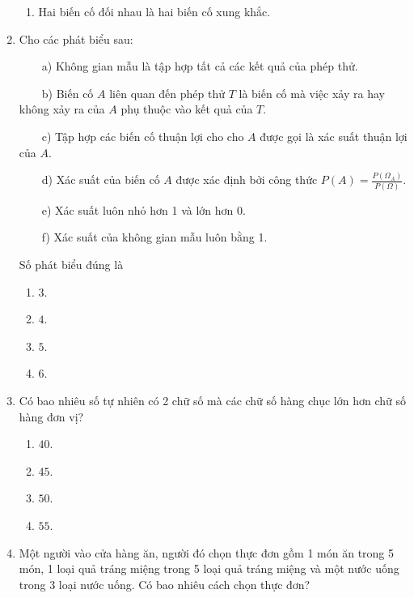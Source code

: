 \begin{enumerate}[label=\textbf{Câu \arabic*.},align=left,left=0cm..0cm,itemindent=*]
\begin{enumerate}[label=\textbf{\Alph*.},align=left,left=1cm..0cm,itemindent=*]
		\item Hai biến cố đối nhau là hai biến cố xung khắc.
	\end{enumerate}
	\item Cho các phát biểu sau:\par
	~~~~a) Không gian mẫu là tập hợp tất cả các kết quả của phép thử.\par
	~~~~b) Biến cố $A$ liên quan đến phép thử $T$ là biến cố mà việc xảy ra hay không xảy ra của $A$ phụ thuộc vào kết quả của $T$.\par
	~~~~c) Tập hợp các biến cố thuận lợi cho cho $A$ được gọi là xác suất thuận lợi của $A$.\par
	~~~~d) Xác suất của biến cố $A$ được xác định bởi công thức $P(A)=\frac{P(\Omega_A)}{P(\Omega)}$.\par
	~~~~e) Xác suất luôn nhỏ hơn 1 và lớn hơn 0.\par
	~~~~f) Xác suất của không gian mẫu luôn bằng 1.\par
	Số phát biểu đúng là
	\begin{multicols}{4}\begin{enumerate}[label=\textbf{\Alph*.},align=left,left=1cm..0cm,itemindent=*]
		\item $3$. \item $4$. \item $5$. \item $6$.
	\end{enumerate}\end{multicols}
	\item Có bao nhiêu số tự nhiên có 2 chữ số mà các chữ số hàng chục lớn hơn chữ số hàng đơn vị?
	\begin{multicols}{4}\begin{enumerate}[label=\textbf{\Alph*.},align=left,left=1cm..0cm,itemindent=*]
		\item $40$. \item $45$. \item $50$. \item $55$.
	\end{enumerate}\end{multicols}
	\item Một người vào cửa hàng ăn, người đó chọn thực đơn gồm 1 món ăn trong 5 món, 1 loại quả tráng miệng trong 5 loại quả tráng miệng và một nước uống trong 3 loại nước uống. Có bao nhiêu cách chọn thực đơn?
	\begin{multicols}{4}\begin{enumerate}[label=\textbf{\Alph*.},align=left,left=1cm..0cm,itemindent=*]

\end{enumerate}
\end{multicols}
\end{enumerate}

